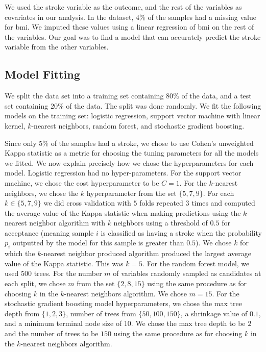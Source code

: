 \documentclass{article}
\begin{document}
We used the stroke variable as the outcome, and the rest of the variables as covariates in our analysis. In the dataset, $4\%$ of the samples had a missing value for bmi. We imputed these values using a linear regression of bmi on the rest of the variables. Our goal was to find a model that can accurately predict the stroke variable from the other variables. 

\subsection{Model Fitting}
We split the data set into a training set containing $80\%$ of the data, and a test set containing $20\%$ of the data. The split was done randomly. We fit the following models on the training set: logistic regression, support vector machine with linear kernel, $k$-nearest neighbors, random forest, and stochastic gradient boosting. 

Since only $5\%$ of the samples had a stroke, we chose to use Cohen's unweighted Kappa statistic as a metric for choosing the tuning parameters for all the models we fitted. We now explain precisely how we chose the hyperparameters for each model. Logistic regression had no hyper-parameters. For the support vector machine, we chose the cost hyperparameter to be $C = 1$. For the $k$-nearest neighbors, we chose the $k$ hyperparameter from the set $\{5, 7, 9\}$. For each $k \in \{5, 7, 9\}$ we did cross validation with $5$ folds repeated $3$ times and computed the average value of the Kappa statistic when making predictions using the $k$-nearest neighbor algorithm with $k$ neighbors using a threshold of $0.5$ for acceptance (meaning sample $i$ is classified as having a stroke when the probability $p_i$ outputted by the model for this sample is greater than $0.5$). We chose $k$ for which the $k$-nearest neighbor produced algorithm produced the largest average value of the Kappa statistic. This was $k = 5$. For the random forest model, we used $500$ trees. For the number $m$ of variables randomly sampled as candidates at each split, we chose $m$ from the set $\{2, 8, 15\}$ using the same procedure as for choosing $k$ in the $k$-nearest neighbors algorithm. We chose $m = 15$. For the stochastic gradient boosting model hyperparameters, we chose the max tree depth from $\{1, 2, 3\}$, number of trees from $\{50, 100, 150\}$, a shrinkage value of $0.1$, and a minimum terminal node size of $10$. We chose the max tree depth to be $2$ and the number of trees to be $150$ using the same procedure as for choosing $k$ in the $k$-nearest neighbors algorithm.
\end{document}
